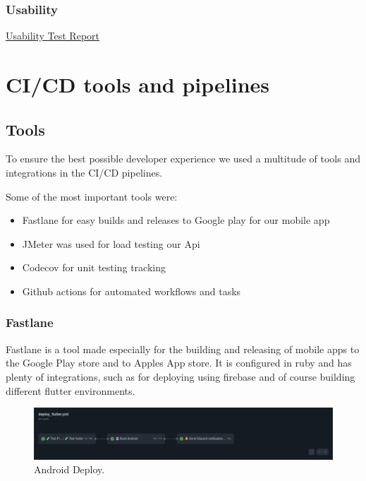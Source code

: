 \documentclass[a4paper]{article}
\begin{document}
\subsubsection{Usability}

\href{https://drive.google.com/file/d/1Z1uJoobU4Lq9xowMiZFRgySqosirVy0d/view?usp=sharing}{Usability Test Report}
\newpage

\section{CI/CD tools and pipelines}

\subsection{Tools}

To ensure the best possible developer experience we used a multitude of tools and integrations
in the CI/CD pipelines. \newline

Some of the most important tools were:
\begin{itemize}
    \item Fastlane for easy builds and releases to Google play for our mobile app
    \item JMeter was used for load testing our Api
    \item Codecov for unit testing tracking
    \item Github actions for automated workflows and tasks
\end{itemize}

\subsubsection{Fastlane}

Fastlane is a tool made especially for the building and releasing of mobile apps to the Google 
Play store and to Apples App store. It is configured in ruby and has plenty of integrations,
such as for deploying using firebase and of course building different flutter environments.

\begin{figure}[h]
  \includegraphics[width=\linewidth]{../Assets/andoird.png}
  \caption{Android Deploy.}
  \label{fig:load graphs}
\end{figure}
\end{document}

